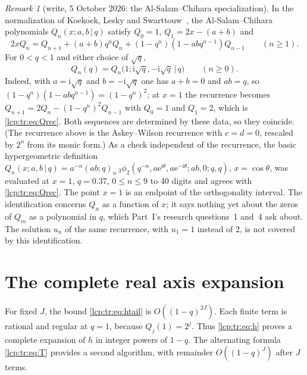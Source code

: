 \documentclass[11pt]{article}
\numberwithin{equation}{section}
\theoremstyle{definition}\newtheorem{definition}[theorem]{Definition}
\theoremstyle{remark}\newtheorem{remark}[theorem]{Remark}
\newcommand{\ee}{\mathrm e}
\newcommand{\ii}{\mathrm i}%
\begin{document}
\begin{remark}[write, 5 October 2026: the Al-Salam--Chihara specialization]\label{lcp:tr:rem:asc}
In the normalization of Koekoek, Lesky and Swarttouw~\cite[\S14.8]{lcp-tr-kls},
the Al-Salam--Chihara polynomials $Q_n(x;a,b\,|\,q)$ satisfy $Q_0=1$,
$Q_1=2x-(a+b)$ and
\[
 2xQ_n=Q_{n+1}+(a+b)q^nQ_n+(1-q^n)(1-abq^{n-1})Q_{n-1}\qquad(n\ge1).
\]
For $0<q<1$ and either choice of $\sqrt q$,
\[
 Q_n(q)=Q_n\bigl(1;\ii\sqrt q,-\ii\sqrt q\,\big|\,q\bigr)\qquad(n\ge0).
\]
Indeed, with $a=\ii\sqrt q$ and $b=-\ii\sqrt q$ one has $a+b=0$ and $ab=q$,
so $(1-q^n)(1-abq^{n-1})=(1-q^n)^2$; at $x=1$ the recurrence becomes
$Q_{n+1}=2Q_n-(1-q^n)^2Q_{n-1}$ with $Q_0=1$ and $Q_1=2$, which is
\eqref{lcp:tr:eq:Qrec}. Both sequences are determined by these data, so they
coincide. (The recurrence above is the Askey--Wilson recurrence with $c=d=0$,
rescaled by $2^n$ from its monic form.) As a check independent of the
recurrence, the basic hypergeometric definition
$Q_n(x;a,b\,|\,q)=a^{-n}(ab;q)_n\,{}_3\phi_2(q^{-n},a\ee^{\ii\theta},a\ee^{-\ii\theta};ab,0;q,q)$,
$x=\cos\theta$, was evaluated at $x=1$, $q=0.37$, $0\le n\le9$ to 40 digits
and agrees with \eqref{lcp:tr:eq:Qrec}. The point $x=1$ is an endpoint of
the orthogonality interval. The identification concerns $Q_n$ as a
function of $x$; it says nothing yet about the zeros of $Q_m$ as a
polynomial in $q$, which Part~I's research questions~1 and~4 ask about.
The solution $u_n$ of the same recurrence, with $u_1=1$ instead of $2$, is
not covered by this identification.
\end{remark}


\section{The complete real axis expansion}\label{lcp:tr:sec:real}
For fixed $J$, the bound \eqref{lcp:tr:eq:htail} is $O((1-q)^{2J})$. Each finite term is rational and regular at $q=1$, because $Q_j(1)=2^j$. Thus \eqref{lcp:tr:eq:h} proves a complete expansion of $h$ in integer powers of $1-q$. The alternating formula \eqref{lcp:tr:eq:T} provides a second algorithm, with remainder $O((1-q)^J)$ after $J$ terms.
\end{document}

